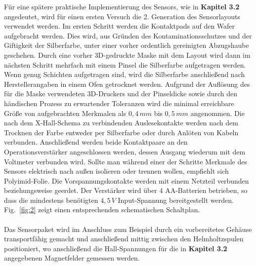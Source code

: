 \documentclass[12pt, a4paper]{article}
\begin{document}
Für eine spätere praktische Implementierung des Sensors, wie in \textbf{Kapitel 3.2} angedeutet, wird für einen ersten Versuch die 2. Generation des Sensorlayouts verwendet werden.\newline
Im ersten Schritt werden die Kontaktpads auf den Wafer aufgebracht werden. Dies wird, aus Gründen des Kontaminationsschutzes und der Giftigkeit der Silberfarbe, unter einer vorher ordentlich gereinigten Abzugshaube geschehen. Durch eine vorher 3D-gedruckte Maske mit dem Layout wird dann im nächsten Schritt mehrfach mit einem Pinsel die Silberfarbe aufgetragen werden. Wenn genug Schichten aufgetragen sind, wird die Silberfarbe anschließend nach Herstellerangaben in einem Ofen getrocknet werden.\newline
Aufgrund der Auflösung des für die Maske verwendeten 3D-Druckers und der Pinseldicke sowie durch den händischen Prozess zu erwartender Toleranzen wird die minimal erreichbare Größe von aufgebrachten Merkmalen als $0,4\,mm$ bis $0,5\,mm$ angenommen.\newline
Die nach dem X-Hall-Schema zu verbindenden Auslesekontakte werden nach dem Trocknen der Farbe entweder per Silberfarbe oder durch Anlöten von Kabeln verbunden. Anschließend werden beide Kontaktpaare an den Operationsverstärker angeschlossen werden, dessen Ausgang wiederum mit dem Voltmeter verbunden wird.\newline
Sollte man während einer der Schritte Merkmale des Sensors elektrisch nach außen isolieren oder trennen wollen, empfiehlt sich Polyimid-Folie.\newline
Die Vorspannungskontakte werden mit einem Netzteil verbunden beziehungsweise geerdet. Der Verstärker wird über 4 AA-Batterien betrieben, so dass die mindestens benötigten $4,5\,V$ Input-Spannung bereitgestellt werden. Fig.~\ref{fig:2} zeigt einen entsprechenden schematischen Schaltplan.\paragraph{}
Das Sensorpaket wird im Anschluss zum Beispiel durch ein vorbereitetes Gehäuse transportfähig gemacht und anschließend mittig zwischen den Helmholtzspulen positioniert, wo anschließend die Hall-Spannungen für die in \textbf{Kapitel 3.2} angegebenen Magnetfelder gemessen werden.
\end{document}
